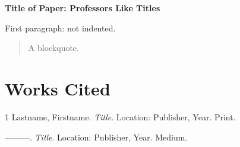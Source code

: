 \documentclass[12pt]{article}
\newcommand{\threeEmDash}{---------}
\begin{document}
\thispagestyle{plain}

\begin{center}
\textbf{Title of Paper: Professors Like Titles}
\end{center}

\noindent First paragraph: not indented.


\begin{quote}
A blockquote.
\end{quote}

\newpage


\section{Works Cited}

\begin{hangparas}{\parindent}{1}
Lastname, Firstname. \emph{Title}. Location: Publisher, Year. Print.

\threeEmDash. \emph{Title}. Location: Publisher, Year. Medium.
\end{hangparas}

\end{document}
